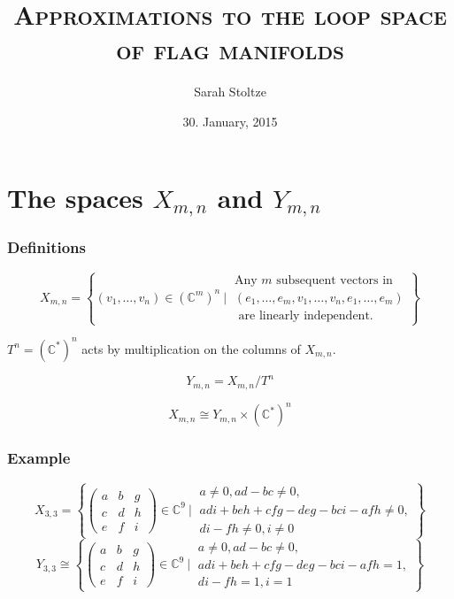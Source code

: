 \documentclass{beamer} %
\author{Sarah Stoltze}
\date{30. January, 2015}
\title[The loop space of flag manifolds]{\textsc{Approximations to the loop space of flag manifolds}}
\institute[IMF]{Institut for Matematik\\Aarhus University}
\newcommand{\C}{\mathbb{C}}
\newcommand{\delim}{\:}
\newcommand{\sdel}{\delim\Bigg\vert\delim}
\newcommand{\set}[1]{\left\{ #1 \right\}}
\begin{document}
\begin{frame}
  \titlepage
\end{frame}

\section{The spaces $X_{m,n}$ and $Y_{m,n}$}

\begin{frame}
  \frametitle{Definitions}
  \begin{definition}
    \[ X_{m,n} = \set{(v_1,\dots,v_n) \in (\C^m)^n \delim\Bigg\vert\delim
      \begin{matrix}
        \text{Any } m \text{ subsequent vectors in } \\
        (e_1,\dots,e_m,v_1,\dots,v_n,e_1,\dots,e_m) \\
        \text{ are linearly independent.}
      \end{matrix} } \]
  \end{definition}
  $T^n= (\C^*)^n$ acts by multiplication on the columns of
  $X_{m,n}$. \pause
  \begin{definition}
    \[ Y_{m,n}  = X_{m,n}/T^n \]
  \end{definition} \pause
  \[ X_{m,n} \cong Y_{m,n} \times (\C^*)^n \]
\end{frame}

\begin{frame}
  \frametitle{Example}
  \[ X_{3,3} = \set{
    \begin{pmatrix}
      a & b & g \\
      c & d & h \\
      e & f & i
    \end{pmatrix} \in \C^9\sdel
    \begin{matrix}
      a \neq 0, ad-bc \neq 0, \\
      adi+beh+cfg-deg-bci-afh \neq 0, \\
      di-fh \neq 0, i \neq 0
    \end{matrix}
  } \]
  \pause
  \[ Y_{3,3} \cong \set{
    \begin{pmatrix}
      a & b & g \\
      c & d & h \\
      e & f & i
    \end{pmatrix} \in \C^9\sdel
    \begin{matrix}
      a \neq 0, ad-bc \neq 0, \\
      adi+beh+cfg-deg-bci-afh = 1, \\
      di-fh = 1, i = 1
    \end{matrix} } \]
\end{frame}
\end{document}
